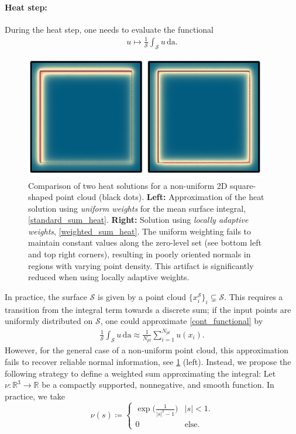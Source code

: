 \documentclass[12pt,openany]{book}
\newcommand{\R}{\mathbb{R}}
\def\S{\mathcal{S}}
\theoremstyle{plainnormal}
\theoremstyle{remark}
\begin{document}
\paragraph{Heat step:}
During the heat step, one needs to evaluate the functional 
\begin{align} \label{cont_functional}
    u \mapsto \frac{1}{\S}\int_\S u\, \mathrm{da}.
\end{align} 
\begin{figure}[!t]
    \centering
    \includegraphics[width=0.95\textwidth]{Figures/2D_combined2.pdf}
    \caption{ Comparison of two heat solutions for a non-uniform 2D square-shaped point cloud (black dots). \textbf{Left:} Approximation of the heat solution using \emph{uniform weights} for the mean surface integral, \cref{standard_sum_heat}. \textbf{Right:} Solution using \emph{locally adaptive weights}, \cref{weighted_sum_heat}. The uniform weighting fails to maintain constant values along the zero-level set (see bottom left and top right corners), resulting in poorly oriented normals in regions with varying point density. This artifact is significantly reduced when using locally adaptive weights.}
    
\label{heatweights}
\end{figure}In practice, the surface $\S$ is given by a point cloud $\{x_i^\S\}_i\subsetneq\mathcal S$. This requires a transition from the integral term towards a discrete sum; if the input points are  uniformly distributed on $\S$, one could approximate
\cref{cont_functional} by \begin{align}\label{standard_sum_heat}
    \frac{1}{\S}\int_\S u\,\mathrm{da}\approx \frac{1}{N_{pt}}\sum_{i = 1}^{N_{pt}} u(x_i).
\end{align}
However, for the general case of a non-uniform point cloud, this approximation fails to recover reliable normal information, see \cref{heatweights} (left). Instead, we propose the following strategy to define a weighted sum approximating the integral: Let $\nu:\R^3 \rightarrow\R$ be a compactly supported, nonnegative, and smooth function. In practice, we take $$\nu(s) \coloneqq \begin{cases}
    \exp\Big(\frac{1}{|s|^2 - 1}\Big) &|s|<1.\\
    0  &\text{else.}
\end{cases}$$
\end{document}
